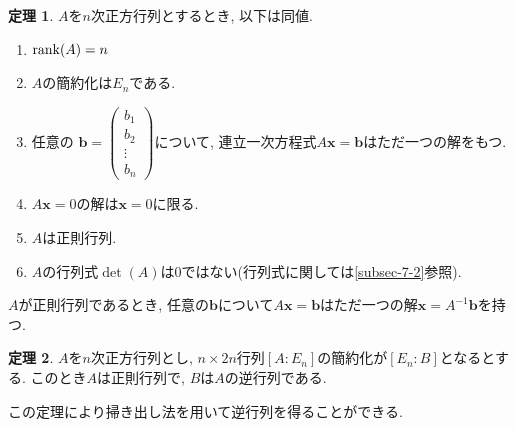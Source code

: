 \documentclass[dvipdfmx,a4paper,11pt]{article}
\theoremstyle{definition}
\newtheorem{thm}{定理}
\begin{document}
 
 
   \begin{tcolorbox}[
    colback = white,
    colframe = green!35!black,
    fonttitle = \bfseries,
    breakable = true]
    \begin{thm}
    $A$を$n$次正方行列とするとき, 以下は同値.
\begin{enumerate}
	\setlength{\parskip}{0cm}
  	\setlength{\itemsep}{0pt} 
\item $\rank (A) =n$
\item $A$の簡約化は$E_n$である.
\item 任意の
$
\bm{b} =\begin{pmatrix}
b_1\\b_2\\\vdots\\b_n
\end{pmatrix}$について, 連立一次方程式$A \bm{x}=\bm{b}$はただ一つの解をもつ.
\item $A \bm{x}=0$の解は$\bm{x}=0$に限る.
\item $A$は正則行列.
\item $A$の行列式$\det(A)$は0ではない(行列式に関しては\ref{subsec-7-2}参照).
\end{enumerate}
  \end{thm}
 \end{tcolorbox}
 
$A$が正則行列であるとき,  任意の$\bm{b}$について$A \bm{x}=\bm{b}$はただ一つの解$\bm{x}=A^{-1}\bm{b}$を持つ. 
 \begin{tcolorbox}[
    colback = white,
    colframe = green!35!black,
    fonttitle = \bfseries,
    breakable = true]
    \begin{thm}
    $A$を$n$次正方行列とし, $n \times 2n$行列$[A : E_n]$の簡約化が$[E_n : B]$となるとする.
    このとき$A$は正則行列で, $B$は$A$の逆行列である.
  \end{thm}
 \end{tcolorbox}
 この定理により掃き出し法を用いて逆行列を得ることができる.
 
\end{document}
